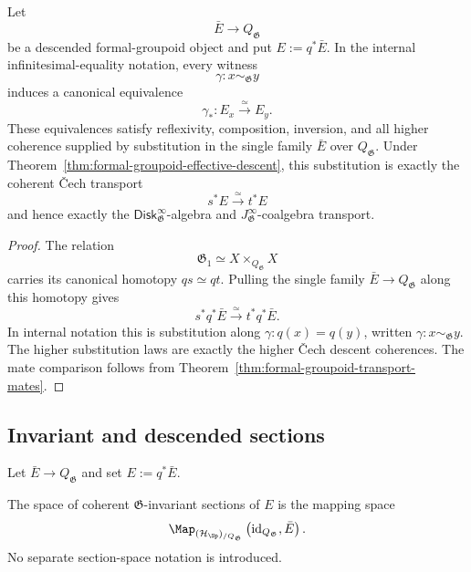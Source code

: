 \begin{proposition}
\label{prop:cartan-dependent-substitution}
Let
\[
    \bar E\longrightarrow Q_{\mathfrak G}
\]
be a descended formal-groupoid object and put $E:=q^*\bar E$.  In the internal
infinitesimal-equality notation, every witness
\[
    \gamma:x\sim_{\mathfrak G}y
\]
induces a canonical equivalence
\[
    \gamma_*:E_x\xrightarrow{\simeq}E_y.
\]
These equivalences satisfy reflexivity, composition, inversion, and all higher
coherence supplied by substitution in the single family $\bar E$ over
$Q_{\mathfrak G}$.  Under
Theorem~\ref{thm:formal-groupoid-effective-descent}, this substitution is
exactly the coherent \v{C}ech transport
\[
    s^*E\xrightarrow{\simeq}t^*E
\]
and hence exactly the
$\mathsf{Disk}^{\infty}_{\mathfrak G}$-algebra and
$J^\infty_{\mathfrak G}$-coalgebra transport.
\end{proposition}

\begin{proof}
The relation
\[
    \mathfrak G_1
    \simeq
    X\times_{Q_{\mathfrak G}}X
\]
carries its canonical homotopy
$q s\simeq q t$.  Pulling the single family
$\bar E\to Q_{\mathfrak G}$ along this homotopy gives
\[
    s^*q^*\bar E
    \xrightarrow{\simeq}
    t^*q^*\bar E.
\]
In internal notation this is substitution along
$\gamma:q(x)=q(y)$, written
$\gamma:x\sim_{\mathfrak G}y$.  The higher substitution laws are exactly the
higher \v{C}ech descent coherences.  The mate comparison follows from
Theorem~\ref{thm:formal-groupoid-transport-mates}.
\end{proof}

\subsection{Invariant and descended sections}

Let $\bar E\to Q_{\mathfrak G}$ and set $E:=q^*\bar E$.

\begin{definition}
\label{def:formal-groupoid-invariant-sections}
The space of coherent $\mathfrak G$-invariant sections of $E$ is the mapping
space
\[
    \Map_{(\mathcal H_{\Sp})_{/Q_{\mathfrak G}}}
    \left(
        \operatorname{id}_{Q_{\mathfrak G}},
        \bar E
    \right).
\]
No separate section-space notation is introduced.
\end{definition}

